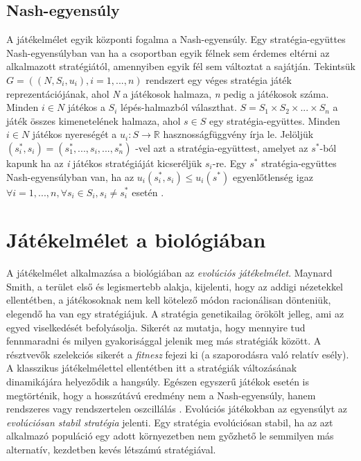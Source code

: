 \subsection{Nash-egyensúly}
A játékelmélet egyik központi fogalma a Nash-egyensúly. Egy stratégia-együttes Nash-e\-gyen\-súly\-ban van ha a csoportban egyik félnek sem érdemes eltérni az alkalmazott stratégiától, amennyiben egyik fél sem változtat a sajátján. Tekintsük \(G = ((N,S_i,u_i), i = 1,...,n)\) rendszert egy véges stratégia játék reprezentációjának, ahol \textit{N} a játékosok halmaza, \textit{n} pedig a játékosok száma. Minden \(i \in N\) játékos a \(S_i\) lépés-halmazból választhat. \(S = S_1 \times S_2 \times ... \times S_n\)  a játék összes kimenetelének halmaza, ahol \(s \in S\) egy stratégia-együttes. Minden \(i \in N\) játékos nyereségét a \(u_i:S \to \mathbb{R}\) hasznosságfüggvény írja le. Jelöljük \((s_i^*,s_i) = (s^*_1,...,s_i,...,s_n^*)\) -vel azt a stratégia-együttest, amelyet az \(s^*\)-ból kapunk ha az \textit{i} játékos stratégiáját kicseréljük \(s_i\)-re. Egy \(s^*\) stratégia-együttes Nash-e\-gyen\-súly\-ban van, ha az \(u_i(s_i^*,s_i)\leq u_i(s^*) \) egyenlőtlenség igaz \(\forall i = 1,...,n, \forall s_i \in S_i, s_i \ne s_i^*\) esetén \cite{nash1951non}.

\section{Játékelmélet a biológiában}
A játékelmélet alkalmazása a biológiában az \textit{evolúciós játékelmélet}. Maynard Smith, a terület első és legismertebb alakja, kijelenti, hogy az addigi nézetekkel ellentétben, a játékosoknak nem kell kötelező módon racionálisan dönteniük, elegendő ha van egy stratégiájuk. A stratégia genetikailag örökölt jelleg, ami az egyed viselkedését befolyásolja. Sikerét az mutatja, hogy mennyire tud fennmaradni és milyen gyakorisággal jelenik meg más stratégiák között. A résztvevők szelekciós sikerét a \textit{fitnesz} fejezi ki (a szaporodásra való relatív esély). A klasszikus játékelmélettel ellentétben itt a stratégiák változásának dinamikájára helyeződik a hangsúly. Egészen egyszerű játékok esetén is megtörténik, hogy a hosszútávú eredmény nem a Nash-egyensúly, hanem rendszeres vagy rendszertelen oszcillálás \cite{nowak2004evolutionary}. Evolúciós játékokban az egyensúlyt az \textit{evolúciósan stabil stratégia} jelenti. Egy stratégia evolúciósan stabil, ha az azt alkalmazó populáció egy adott környezetben nem győzhető le semmilyen más alternatív, kezdetben kevés létszámú stratégiával.
 
